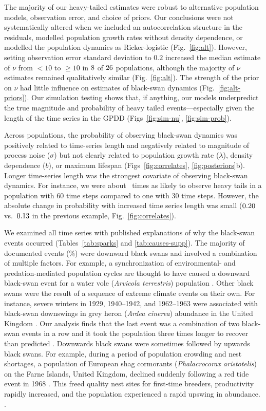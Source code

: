 The majority of our heavy-tailed estimates were robust to alternative
population models, observation error, and choice of priors. Our conclusions
were not systematically altered when we included an autocorrelation structure
in the residuals, modelled population growth rates without density dependence,
or modelled the population dynamics as Ricker-logistic (Fig.~\ref{fig:alt}).
However, setting observation error standard deviation to $0.2$ increased the
median estimate of $\nu$ from $<10$ to $\ge 10$ in $8$ of
$26$ populations, although the majority of $\nu$ estimates remained
qualitatively similar (Fig.~\ref{fig:alt}). The strength of the prior on $\nu$
had little influence on estimates of black-swan dynamics
(Fig.~\ref{fig:alt-priors}). Our simulation testing shows that, if anything,
our models underpredict the true magnitude and probability of heavy tailed
events---especially given the length of the time series in the GPDD
(Figs~\ref{fig:sim-nu}, \ref{fig:sim-prob}).

Across populations, the probability of observing black-swan dynamics was
positively related to time-series length and negatively related to magnitude of
process noise ($\sigma$) but not clearly related to population growth rate
($\lambda$), density dependence ($b$), or maximum lifespan
(Figs~\ref{fig:correlates}, \ref{fig:posteriors}b). Longer time-series length
was the strongest covariate of observing black-swan dynamics. For instance, we
were about \pIncHeavyNThirtyNSixty~times as likely to observe heavy tails in a
population with 60 time steps compared to one with 30 time steps. However, the
absolute change in probability with increased time series length was small
($0.20$ vs.\ $0.13$ in the previous example,
Fig.~\ref{fig:correlates}).

We examined all time series with published explanations of why the black-swan
events occurred (Tables~\ref{tab:sparks} and \ref{tab:causes-supp}). The
majority of documented events (\percBSDown \%) were downward black swans and
involved a combination of multiple factors. For example, a synchronization of
environmental- and predation-mediated population cycles are thought to have
caused a downward black-swan event for a water vole (\textit{Arvicola
  terrestris}) population \citep{saucy1994}. Other black swans were the result
of a sequence of extreme climate events on their own. For instance, severe
winters in 1929, 1940--1942, and 1962--1963 were associated with black-swan
downswings in grey heron (\textit{Ardea cinerea}) abundance in the United
Kingdom \citep{stafford1971}. Our analysis finds that the last event was a
combination of two black-swan events in a row and it took the population three
times longer to recover than predicted \citep{stafford1971}. Downwards black
swans were sometimes followed by upwards black swans. For example, during a
period of population crowding and nest shortages, a population of European
shag cormorants (\textit{Phalacrocorax aristotelis}) on the Farne Islands,
United Kingdom, declined suddenly following a red tide event in 1968
\citep{potts1980}. This freed quality nest sites for first-time breeders,
productivity rapidly increased, and the population experienced a rapid upswing
in abundance. \citep{potts1980}.


